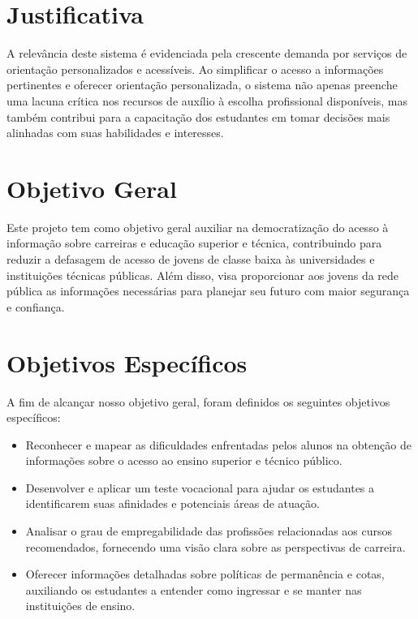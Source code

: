

\section{Justificativa}

A relevância deste sistema é evidenciada pela crescente demanda por serviços de orientação personalizados e acessíveis. Ao simplificar o acesso a informações pertinentes e oferecer orientação personalizada, o sistema não apenas preenche uma lacuna crítica nos recursos de auxílio à escolha profissional disponíveis, mas também contribui para a capacitação dos estudantes em tomar decisões mais alinhadas com suas habilidades e interesses.

\section{Objetivo Geral}

Este projeto tem como objetivo geral auxiliar na democratização do acesso à informação sobre carreiras e educação superior e técnica, contribuindo para reduzir a defasagem de acesso de jovens de classe baixa às universidades e instituições técnicas públicas. Além disso, visa proporcionar aos jovens da rede pública as informações necessárias para planejar seu futuro com maior segurança e confiança.

\section{Objetivos Específicos}

A fim de alcançar nosso objetivo geral, foram definidos os seguintes objetivos específicos:

\begin{itemize}
    \item Reconhecer e mapear as dificuldades enfrentadas pelos alunos na obtenção de informações sobre o acesso ao ensino superior e técnico público.
    \item Desenvolver e aplicar um teste vocacional para ajudar os estudantes a identificarem suas afinidades e potenciais áreas de atuação.
     \item Analisar o grau de empregabilidade das profissões relacionadas aos cursos recomendados, fornecendo uma visão clara sobre as perspectivas de carreira.
    \item Oferecer informações detalhadas sobre políticas de permanência e cotas, auxiliando os estudantes a entender como ingressar e se manter nas instituições de ensino.

\end{itemize}

